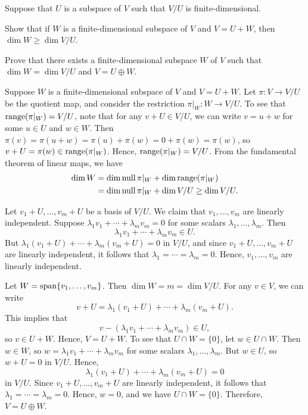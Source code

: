 \begin{exc}
\begin{exercise}
Suppose that $U$ is a subspace of $V$ such that $V/U$ is finite-dimensional.
\begin{parts}
\item Show that if $W$ is a finite-dimensional subspace of $V$ and $V=U+W$, then
  $\dim W\ge\dim V/U$.
\item Prove that there exists a finite-dimensional subspace $W$ of $V$ such that
  $\dim W=\dim V/U$ and $V=U\oplus W$.
\end{parts}
\end{exercise}
\begin{solution}\leavevmode
\begin{parts}
\item Suppose $W$ is a finite-dimensional subspace of $V$ and $V=U+W$. Let
  $\pi\colon V\to V/U$ be the quotient map, and consider the restriction
  $\pi|_W\colon W\to V/U$. To see that $\operatorname{range}(\pi|_W)=V/U$, note that for any
  $v+U\in V/U$, we can write $v=u+w$ for some $u\in U$ and $w\in W$. Then
  $\pi(v)=\pi(u+w)=\pi(u)+\pi(w)=0+\pi(w)=\pi(w)$, so
  $v+U=\pi(w)\in\operatorname{range}(\pi|_W)$. Hence, $\operatorname{range}(\pi|_W)=V/U$. From the
  fundamental theorem of linear maps, we have
  \begin{align*}
  \operatorname{dim} W &= \operatorname{dim}\operatorname{null}\pi|_W+\operatorname{dim}\operatorname{range}(\pi|_W)\\
         &= \operatorname{dim}\operatorname{null}\pi|_W+\operatorname{dim} V/U \ge \operatorname{dim} V/U.
  \end{align*}
\item Let $v_1+U,\dots,v_m+U$ be a basis of $V/U$. We claim that
  $v_1,\dots,v_m$ are linearly independent. Suppose
  $\lambda_1v_1+\cdots+\lambda_mv_m=0$ for some scalars
  $\lambda_1,\dots,\lambda_m$. Then
  \[ \lambda_1v_1+\cdots+\lambda_mv_m\in U. \]
  But $\lambda_1(v_1+U)+\cdots+\lambda_m(v_m+U)=0$ in $V/U$, and since
  $v_1+U,\dots,v_m+U$ are linearly independent, it follows that
  $\lambda_1=\cdots=\lambda_m=0$. Hence, $v_1,\dots,v_m$ are linearly
  independent.

  Let $W=\operatorname{span}\{v_1,\dots,v_m\}$. Then $\dim W=m=\dim V/U$. For any $v\in V$, we
  can write
  \[ v+U = \lambda_1(v_1+U)+\cdots+\lambda_m(v_m+U). \]
  This implies that
  \[ v-(\lambda_1v_1+\cdots+\lambda_mv_m)\in U, \]
  so $v\in U+W$. Hence, $V=U+W$. To see that $U\cap W=\{0\}$, let
  $w\in U\cap W$. Then $w\in W$, so $w=\lambda_1v_1+\cdots+\lambda_mv_m$ for
  some scalars $\lambda_1,\dots,\lambda_m$. But $w\in U$, so $w+U=0$ in $V/U$.
  Hence,
  \[ \lambda_1(v_1+U)+\cdots+\lambda_m(v_m+U) = 0 \]
  in $V/U$. Since $v_1+U,\dots,v_m+U$ are linearly independent, it follows that
  $\lambda_1=\cdots=\lambda_m=0$. Hence, $w=0$, and we have $U\cap W=\{0\}$.
  Therefore, $V=U\oplus W$. \qedhere
\end{parts}
\end{solution}


\end{exc}
